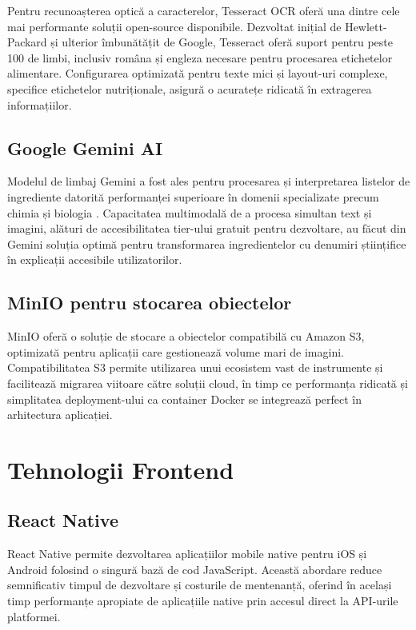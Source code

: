 Pentru recunoașterea optică a caracterelor, Tesseract OCR oferă una dintre cele mai performante soluții open-source disponibile. Dezvoltat inițial de Hewlett-Packard și ulterior îmbunătățit de Google, Tesseract oferă suport pentru peste 100 de limbi, inclusiv româna și engleza necesare pentru procesarea etichetelor alimentare. Configurarea optimizată pentru texte mici și layout-uri complexe, specifice etichetelor nutriționale, asigură o acuratețe ridicată în extragerea informațiilor.

\subsection{Google Gemini AI}

Modelul de limbaj Gemini a fost ales pentru procesarea și interpretarea listelor de ingrediente datorită performanței superioare în domenii specializate precum chimia și biologia \cite{GptvGemini2024}. Capacitatea multimodală de a procesa simultan text și imagini, alături de accesibilitatea tier-ului gratuit pentru dezvoltare, au făcut din Gemini soluția optimă pentru transformarea ingredientelor cu denumiri științifice în explicații accesibile utilizatorilor.

\subsection{MinIO pentru stocarea obiectelor}

MinIO oferă o soluție de stocare a obiectelor compatibilă cu Amazon S3, optimizată pentru aplicații care gestionează volume mari de imagini. Compatibilitatea S3 permite utilizarea unui ecosistem vast de instrumente și facilitează migrarea viitoare către soluții cloud, în timp ce performanța ridicată și simplitatea deployment-ului ca container Docker se integrează perfect în arhitectura aplicației.

\section{Tehnologii Frontend}

\subsection{React Native}

React Native permite dezvoltarea aplicațiilor mobile native pentru iOS și Android folosind o singură bază de cod JavaScript. Această abordare reduce semnificativ timpul de dezvoltare și costurile de mentenanță, oferind în același timp performanțe apropiate de aplicațiile native prin accesul direct la API-urile platformei.

